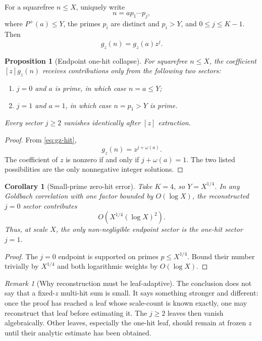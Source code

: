 \documentclass[11pt]{article}
\newtheorem{proposition}[theorem]{Proposition}
\newtheorem{corollary}[theorem]{Corollary}
\theoremstyle{definition}
\theoremstyle{remark}
\newtheorem{remark}[theorem]{Remark}
\newcommand{\1}{\mathbf 1}
\begin{document}
For a squarefree $n\le X$, uniquely write
\begin{equation}\label{eq:large-small-factorization}
n=a p_1\cdots p_j,
\end{equation}
where $P^+(a)\le Y$, the primes $p_i$ are distinct and $p_i>Y$, and $0\le j\le K-1$.  Then
\begin{equation}\label{eq:gz-hit}
g_z(n)=g_z(a)z^j.
\end{equation}

\begin{proposition}[Endpoint one-hit collapse]\label{prop:onehit-collapse}
For squarefree $n\le X$, the coefficient $[z]g_z(n)$ receives contributions only from the following two sectors:
\begin{enumerate}[label=\textup{(\roman*)}]
\item $j=0$ and $a$ is prime, in which case $n=a\le Y$;
\item $j=1$ and $a=1$, in which case $n=p_1>Y$ is prime.
\end{enumerate}
Every sector $j\ge2$ vanishes identically after $[z]$ extraction.
\end{proposition}

\begin{proof}
From \eqref{eq:gz-hit},
\[
g_z(n)=z^{j+\omega(a)}.
\]
The coefficient of $z$ is nonzero if and only if $j+\omega(a)=1$.  The two listed possibilities are the only nonnegative integer solutions.
\end{proof}

\begin{corollary}[Small-prime zero-hit error]\label{cor:small-prime}
Take $K=4$, so $Y=X^{1/4}$.  In any Goldbach correlation with one factor bounded by $O(\log X)$, the reconstructed $j=0$ sector contributes
\begin{equation}\label{eq:small-prime-error}
O\!\left(X^{1/4}(\log X)^2\right).
\end{equation}
Thus, at scale $X$, the only non-negligible endpoint sector is the one-hit sector $j=1$.
\end{corollary}

\begin{proof}
The $j=0$ endpoint is supported on primes $p\le X^{1/4}$.  Bound their number trivially by $X^{1/4}$ and both logarithmic weights by $O(\log X)$.
\end{proof}

\begin{remark}[Why reconstruction must be leaf-adaptive]
The conclusion does not say that a fixed-$z$ multi-hit sum is small.  It says something stronger and different: once the proof has reached a leaf whose scale-count is known exactly, one may reconstruct that leaf before estimating it.  The $j\ge2$ leaves then vanish algebraically.  Other leaves, especially the one-hit leaf, should remain at frozen $z$ until their analytic estimate has been obtained.
\end{remark}
\end{document}
